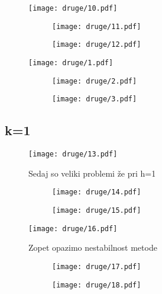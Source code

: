 \documentclass{article}
\begin{document}
\begin{figure}[H]
\texttt{[image: druge/10.pdf]}
\end{figure}
\begin{figure}[H]
\begin{subfigure}{.5\textwidth}
\texttt{[image: druge/11.pdf]}
\end{subfigure}
\begin{subfigure}{.5\textwidth}
\texttt{[image: druge/12.pdf]}
\end{subfigure}
\end{figure}

\begin{figure}[H]
\texttt{[image: druge/1.pdf]}
\end{figure}
\begin{figure}[H]
\begin{subfigure}{.5\textwidth}
\texttt{[image: druge/2.pdf]}
\end{subfigure}
\begin{subfigure}{.5\textwidth}
\texttt{[image: druge/3.pdf]}
\end{subfigure}
\end{figure}

\newpage
\subsection{k=1}

\begin{figure}[H]
\texttt{[image: druge/13.pdf]}
\caption*{Sedaj so veliki problemi že pri h=1}
\end{figure}
\begin{figure}[H]
\begin{subfigure}{.5\textwidth}
\texttt{[image: druge/14.pdf]}
\end{subfigure}
\begin{subfigure}{.5\textwidth}
\texttt{[image: druge/15.pdf]}
\end{subfigure}
\end{figure}

\begin{figure}[H]
\texttt{[image: druge/16.pdf]}
\caption*{Zopet opazimo nestabilnost metode}
\end{figure}
\begin{figure}[H]
\begin{subfigure}{.5\textwidth}
\texttt{[image: druge/17.pdf]}
\end{subfigure}
\begin{subfigure}{.5\textwidth}
\texttt{[image: druge/18.pdf]}
\end{subfigure}
\end{figure}
\end{document}
